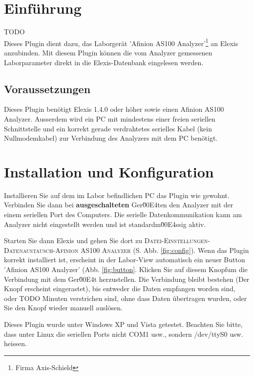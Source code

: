 \documentclass[a4paper]{scrartcl}
\begin{document}
\section{Einführung}
TODO\\
Dieses Plugin dient dazu, das Laborgerät 'Afinion AS100 Analyzer'\footnote{Firma Axis-Schield} an Elexis anzubinden. Mit diesem Plugin können die vom Analyzer gemessenen Laborparameter direkt in die Elexis-Datenbank eingelesen werden.

\subsection{Voraussetzungen}
Dieses Plugin benötigt Elexis 1.4.0 oder höher sowie einen Afinion AS100 Analyzer. Ausserdem wird ein PC mit mindestens einer freien seriellen Schnittstelle und ein korrekt gerade verdrahtetes serielles Kabel (kein Nullmodemkabel) zur Verbindung des Analyzers mit dem PC benötigt.

\section{Installation und Konfiguration}
Installieren Sie auf dem im Labor befindlichen PC das Plugin wie gewohnt. Verbinden Sie dann bei \textbf{ausgeschalteten} Ger\u00E4ten den Analyzer mit der einem seriellen Port des Computers. Die serielle Datenkommunikation kann am Analyzer nicht eingestellt werden und ist standardm\u00E4ssig aktiv.

Starten Sie dann Elexis und gehen Sie dort zu \textsc{Datei-Einstellungen-Datenaustausch-Afinion AS100 Analyzer} (S. Abb. \ref{fig:config}).
%
%
Wenn das Plugin korrekt installiert ist, erscheint in der Labor-View automatisch ein neuer Button 'Afinion AS100 Analyzer' (Abb. \ref{fig:button}. Klicken Sie auf diesem Knopfum die Verbindung mit dem Ger\u00E4t herzustellen. Die Verbindung bleibt bestehen (Der Knopf erscheint eingerastet), bis entweder die Daten empfangen worden sind, oder TODO Minuten verstrichen sind, ohne dass Daten übertragen wurden, oder Sie den Knopf wieder manuell auslösen.

Dieses Plugin wurde unter Windows XP und Vista getestet. Beachten Sie bitte, dass unter Linux die seriellen Ports nicht COM1 usw., sondern /dev/ttyS0 usw. heissen.
\end{document}
